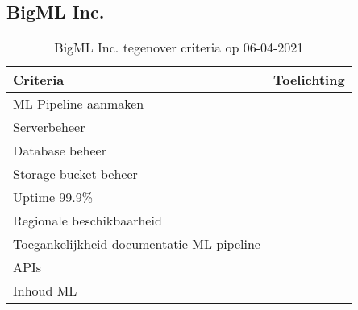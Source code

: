 \subsection*{BigML Inc.}\label{appendix:detailed-overview-of-cloud-computing-platforms:bigml-inc}
\begin{table}[hbt!]
  \centering
  \begin{tabular}{|p{.2\linewidth}|p{.74\linewidth}|}
  \hline
  \textbf{Criteria} & \textbf{Toelichting} \\ \hline
    ML Pipeline \newline aanmaken
    &

    \\ \hline

    Serverbeheer
    &

    \\ \hline

    Database beheer
    &

    \\ \hline

    Storage \newline bucket beheer
    &

    \\ \hline

    Uptime 99.9\%
    &

    \\ \hline

    Regionale \newline beschikbaarheid
    &

    \\ \hline

    Toegankelijkheid documentatie ML pipeline
    &

    \\ \hline

    APIs
    &

    \\ \hline

    Inhoud ML
    &

    \\ \hline
  \end{tabular}
  \caption{BigML Inc. tegenover criteria op 06-04-2021}
  \label{table:bigml-inc-against-criteria}
\end{table}

\newpage

